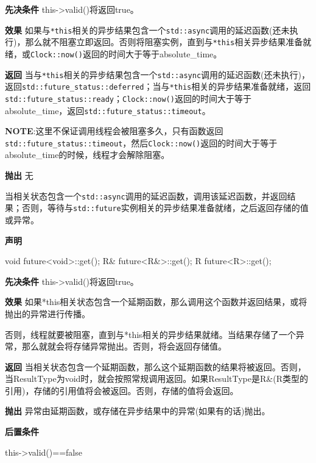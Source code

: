 \textbf{先决条件}
this->valid()将返回true。

\textbf{效果}
如果与\texttt{*this}相关的异步结果包含一个\texttt{std::async}调用的延迟函数(还未执行)，那么就不阻塞立即返回。否则将阻塞实例，直到与\texttt{*this}相关异步结果准备就绪，或\texttt{Clock::now()}返回的时间大于等于absolute\_time。

\textbf{返回}
当与\texttt{*this}相关的异步结果包含一个\texttt{std::async}调用的延迟函数(还未执行)，返回\texttt{std::future\_status::deferred}；当与\texttt{*this}相关的异步结果准备就绪，返回\texttt{std::future\_status::ready}；\texttt{Clock::now()}返回的时间大于等于absolute\_time，返回\texttt{std::future\_status::timeout}。

\textbf{NOTE}:这里不保证调用线程会被阻塞多久，只有函数返回\texttt{std::future\_status::timeout}，然后\texttt{Clock::now()}返回的时间大于等于absolute\_time的时候，线程才会解除阻塞。

\textbf{抛出}
无


当相关状态包含一个\texttt{std::async}调用的延迟函数，调用该延迟函数，并返回结果；否则，等待与\texttt{std::future}实例相关的异步结果准备就绪，之后返回存储的值或异常。

\textbf{声明}

\begin{cpp}
void future<void>::get();
R& future<R&>::get();
R future<R>::get();
\end{cpp}

\textbf{先决条件}
this->valid()将返回true。

\textbf{效果}
如果*this相关状态包含一个延期函数，那么调用这个函数并返回结果，或将抛出的异常进行传播。

否则，线程就要被阻塞，直到与*this相关的异步结果就绪。当结果存储了一个异常，那么就就会将存储异常抛出。否则，将会返回存储值。

\textbf{返回}
当相关状态包含一个延期函数，那么这个延期函数的结果将被返回。否则，当ResultType为void时，就会按照常规调用返回。如果ResultType是R\&(R类型的引用)，存储的引用值将会被返回。否则，存储的值将会返回。

\textbf{抛出}
异常由延期函数，或存储在异步结果中的异常(如果有的话)抛出。

\textbf{后置条件}

\begin{cpp}
this->valid()==false
\end{cpp}


